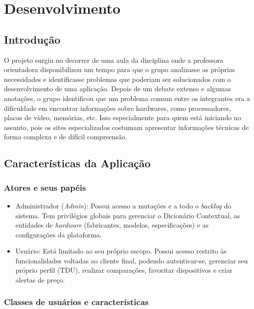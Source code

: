 \chapter{Desenvolvimento}
\label{cap:02}


\section{Introdução}


O projeto surgiu no decorrer de uma aula da disciplina onde a professora orientadora disponibilizou um tempo para que o grupo
analizasse as próprias necessidades e identificasse problemas que poderiam ser solucionados com o desenvolvimento de uma aplicação.
Depois de um debate extenso e algumas anotações, o grupo identificou que um problema comum entre os integrantes era a dificuldade
em encontrar informações sobre hardwares, como processadores, placas de vídeo, memórias, etc. Isso especialmente para quem está 
iniciando no assunto, pois os sites especializados costumam apresentar informações técnicas de forma complexa e de difícil compreensão.

\section{Características da Aplicação}

\subsection{Atores e seus papéis}

\begin{itemize} 
    \item {Administrador (\textit{Admin}):} Possui acesso a mutações e a todo o \textit{backlog} do sistema. Tem privilégios globais para gerenciar o Dicionário Contextual, as entidades de \textit{hardware} (fabricantes, modelos, especificações) e as configurações da plataforma.
    \item {Usuário:} Está limitado ao seu próprio escopo. Possui acesso restrito às funcionalidades voltadas ao cliente final, podendo autenticar-se, gerenciar seu próprio perfil (TDU), realizar comparações, favoritar dispositivos e criar alertas de preço.
\end{itemize}

\subsection{Classes de usuários e características}

